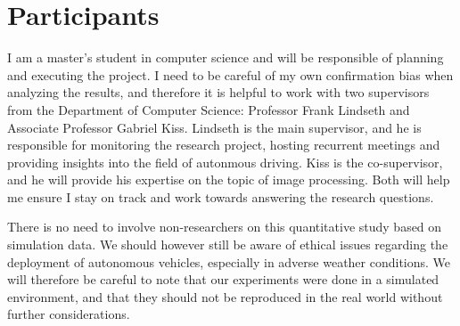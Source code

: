 \section*{Participants}
I am a master's student in computer science and will be responsible of planning and executing the project. I need to be careful of my own confirmation bias when analyzing the results, and therefore it is helpful to work with two supervisors from the Department of Computer Science: Professor Frank Lindseth and Associate Professor Gabriel Kiss. Lindseth is the main supervisor, and he is responsible for monitoring the research project, hosting recurrent meetings and providing insights into the field of autonmous driving. Kiss is the co-supervisor, and he will provide his expertise on the topic of image processing. Both will help me ensure I stay on track and work towards answering the research questions. 

There is no need to involve non-researchers on this quantitative study based on simulation data. We should however still be aware of ethical issues regarding the deployment of autonomous vehicles, especially in adverse weather conditions. We will therefore be careful to note that our experiments were done in a simulated environment, and that they should not be reproduced in the real world without further considerations.

\begin{comment}
Can describe that it is more of a data study than a user study (analytic)

10 %
C13: Describe all participants and their roles in the research project
C14: Explain whether/why there is a need to involve non-researcher participants
C15: Discuss the ethical issues of involving non-researcher participants and how to address them
C16: Reflect on your own role as researcher in the project, and how it will impact the validity of your results
\end{comment}